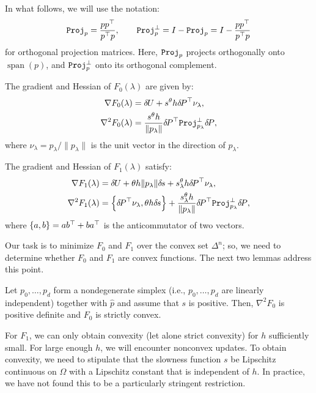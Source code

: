 \documentclass[smallcondensed]{svjour3}
\begin{document}
In what follows, we will use the notation:
\begin{equation}
  \mathtt{Proj}_p = \frac{p p^\top}{p^\top p}, \qquad \mathtt{Proj}_p^\perp = I - \mathtt{Proj}_p = I - \frac{p p^\top}{p^\top p}
\end{equation}
for orthogonal projection matrices. Here, $\mathtt{Proj}_p$ projects
orthogonally onto $\operatorname{span}(p)$, and $\mathtt{Proj}_p^\perp$ onto
its orthogonal complement.

\begin{proposition}\label{prop:F0-grad-and-Hess}
  The gradient and Hessian of $F_0(\lambda)$ are given by:
  \begin{align}
    \nabla F_0(\lambda) &= {\delta \hspace{-0.09em} U} + s^{\theta} h {\delta \hspace{-0.14em} P}^\top \nu_\lambda,\label{eq:F0-grad} \\
    \nabla^2 F_0(\lambda) &= \frac{s^{\theta} h}{\|p_\lambda\|} {\delta \hspace{-0.14em} P}^\top \mathtt{Proj}^\perp_{p_\lambda} {\delta \hspace{-0.14em} P},
  \end{align}
  where $\nu_\lambda = p_\lambda/\|p_\lambda\|$ is the unit vector in the
  direction of $p_\lambda$.
\end{proposition}

\begin{proposition}\label{prop:F1-grad-and-Hess}
  The gradient and Hessian of $F_1(\lambda)$ satisfy:
  \begin{align}
    \nabla F_1(\lambda) &= {\delta \hspace{-0.09em} U} + \theta h \|p_\lambda\| {\delta \hspace{-0.1em} s} + s^{\theta}_\lambda h {\delta \hspace{-0.14em} P}^\top \nu_\lambda, \\
    \nabla^2 F_1(\lambda) &= \left\{{\delta \hspace{-0.14em} P}^\top \nu_\lambda, \theta h {\delta \hspace{-0.1em} s}\right\} + \frac{s^\theta_\lambda h}{\|p_\lambda\|} {\delta \hspace{-0.14em} P}^\top \mathtt{Proj}^\perp_{p_\lambda} {\delta \hspace{-0.14em} P}, \label{eq:hess-F1}
  \end{align}
  where $\left\{a, b\right\} = ab^\top + ba^\top$ is the anticommutator of two
  vectors.
\end{proposition}

Our task is to minimize $F_0$ and $F_1$ over the convex set
$\Delta^n$; so, we need to determine whether $F_0$ and $F_1$ are
convex functions. The next two lemmas address this point.

\begin{lemma}\label{lemma:dPt-cprojp-dP-pd}
  Let $p_0, \hdots, p_d$ form a nondegenerate simplex (i.e.,
  $p_0, \hdots, p_d$ are linearly independent) together with $\hat{p}$
  and assume that $s$ is positive. Then, $\nabla^2 F_0$ is positive
  definite and $F_0$ is strictly convex.
\end{lemma}

For $F_1$, we can only obtain convexity (let alone strict convexity)
for $h$ sufficiently small. For large enough $h$, we will encounter
nonconvex updates. To obtain convexity, we need to stipulate that the
slowness function $s$ be Lipschitz continuous on $\Omega$ with a
Lipschitz constant that is independent of $h$. In practice, we have
not found this to be a particularly stringent restriction.
\end{document}
